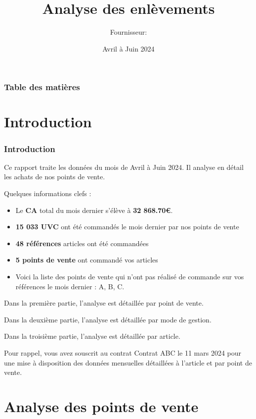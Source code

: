 \documentclass{beamer}
\title{Analyse des enlèvements}
\author{Fournisseur: \textbf{}}
\date{Avril à Juin 2024}
\begin{document}
    \begin{frame}
        \titlepage
    \end{frame}

    \begin{frame}
        \frametitle{Table des matières}
        \tableofcontents
    \end{frame}

    \section{Introduction}

    \begin{frame}
        \tiny
        \frametitle{Introduction}
        Ce rapport traite les données du mois de Avril à Juin 2024. Il analyse en détail les achats de nos points de vente.\par

        Quelques informations clefs :

        \begin{itemize}
            \item{Le \textbf{CA} total du mois dernier s’élève à \textbf{32 868.70€}.}
            \item{\textbf{15 033 UVC} ont été commandés le mois dernier par nos points de vente}
            \item{\textbf{48 références} articles ont été commandées}
            \item{\textbf{5 points de vente} ont commandé vos articles}
            \item{Voici la liste des points de vente qui n’ont pas réalisé de commande sur vos références le mois dernier : A, B, C.}
        \end{itemize}

        Dans la première partie, l’analyse est détaillée par point de vente.\par
        Dans la deuxième partie, l’analyse est détaillée par mode de gestion.\par
        Dans la troisième partie, l’analyse est détaillée par article.\par
        Pour rappel, vous avez souscrit au contrat Contrat ABC le 11 mars 2024 pour une mise à disposition des données mensuelles détaillées à l’article et par point de vente.\par
    \end{frame}

    \section{Analyse des points de vente}
\end{document}
